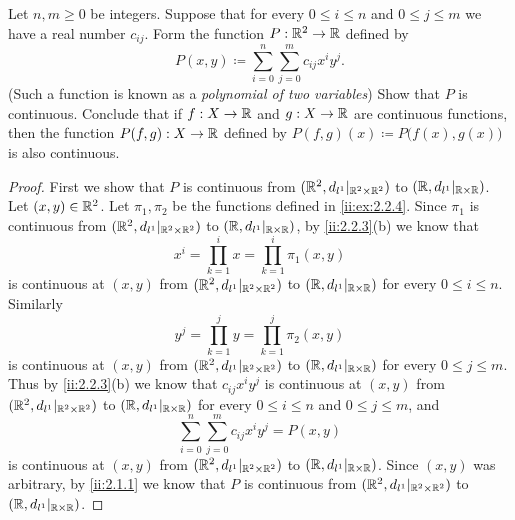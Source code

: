 \begin{ex}\label{ii:ex:2.2.5}
  Let \(n, m \geq 0\) be integers.
  Suppose that for every \(0 \leq i \leq n\) and \(0 \leq j \leq m\) we have a real number \(c_{ij}\).
  Form the function \(P : \mathbb{R}^2 \to \mathbb{R}\) defined by
  \[
    P(x, y) \coloneqq \sum_{i = 0}^n \sum_{j = 0}^m c_{ij} x^i y^j.
  \]
  (Such a function is known as a \emph{polynomial of two variables})
  Show that \(P\) is continuous.
  Conclude that if \(f : X \to \mathbb{R}\) and \(g : X \to \mathbb{R}\) are continuous functions, then the function \(P(f, g) : X \to \mathbb{R}\) defined by \(P(f, g)(x) \coloneqq P\big(f(x), g(x)\big)\) is also continuous.
\end{ex}

\begin{proof}
  First we show that \(P\) is continuous from \((\mathbb{R}^2, d_{l^1}|_{\mathbb{R}^2 \times \mathbb{R}^2})\) to \((\mathbb{R}, d_{l^1}|_{\mathbb{R} \times \mathbb{R}})\).
  Let \((x, y) \in \mathbb{R}^2\).
  Let \(\pi_1, \pi_2\) be the functions defined in \cref{ii:ex:2.2.4}.
  Since \(\pi_1\) is continuous from \((\mathbb{R}^2, d_{l^1}|_{\mathbb{R}^2 \times \mathbb{R}^2})\) to \((\mathbb{R}, d_{l^1}|_{\mathbb{R} \times \mathbb{R}})\), by \cref{ii:2.2.3}(b) we know that
  \[
    x^i = \prod_{k = 1}^i x = \prod_{k = 1}^i \pi_1(x, y)
  \]
  is continuous at \((x, y)\) from \((\mathbb{R}^2, d_{l^1}|_{\mathbb{R}^2 \times \mathbb{R}^2})\) to \((\mathbb{R}, d_{l^1}|_{\mathbb{R} \times \mathbb{R}})\) for every \(0 \leq i \leq n\).
  Similarly
  \[
    y^j = \prod_{k = 1}^j y = \prod_{k = 1}^j \pi_2(x, y)
  \]
  is continuous at \((x, y)\) from \((\mathbb{R}^2, d_{l^1}|_{\mathbb{R}^2 \times \mathbb{R}^2})\) to \((\mathbb{R}, d_{l^1}|_{\mathbb{R} \times \mathbb{R}})\) for every \(0 \leq j \leq m\).
  Thus by \cref{ii:2.2.3}(b) we know that \(c_{ij} x^i y^j\) is continuous at \((x, y)\) from \((\mathbb{R}^2, d_{l^1}|_{\mathbb{R}^2 \times \mathbb{R}^2})\) to \((\mathbb{R}, d_{l^1}|_{\mathbb{R} \times \mathbb{R}})\) for every \(0 \leq i \leq n\) and \(0 \leq j \leq m\), and
  \[
    \sum_{i = 0}^n \sum_{j = 0}^m c_{ij} x^i y^j = P(x, y)
  \]
  is continuous at \((x, y)\) from \((\mathbb{R}^2, d_{l^1}|_{\mathbb{R}^2 \times \mathbb{R}^2})\) to \((\mathbb{R}, d_{l^1}|_{\mathbb{R} \times \mathbb{R}})\).
  Since \((x, y)\) was arbitrary, by \cref{ii:2.1.1} we know that \(P\) is continuous from \((\mathbb{R}^2, d_{l^1}|_{\mathbb{R}^2 \times \mathbb{R}^2})\) to \((\mathbb{R}, d_{l^1}|_{\mathbb{R} \times \mathbb{R}})\).


\end{proof}
